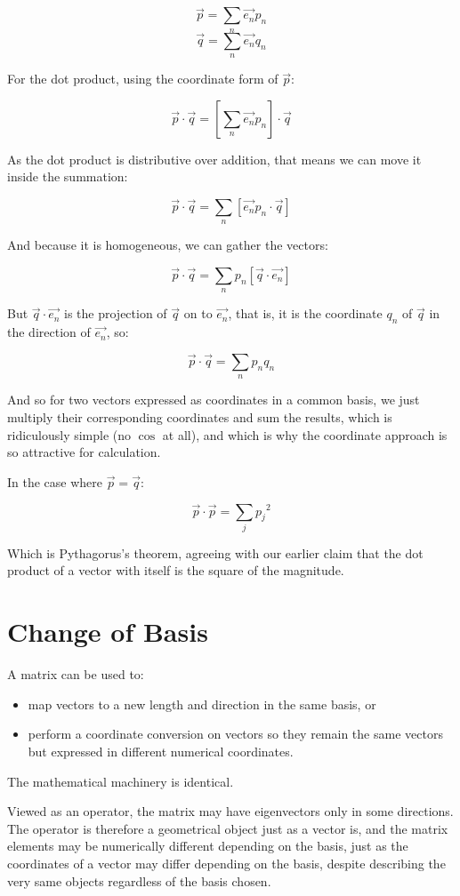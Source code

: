 $$\vec{p} = \sum_n \vec{e_n}p_n$$
$$\vec{q} = \sum_n \vec{e_n}q_n$$

For the dot product, using the coordinate form of $\vec{p}$:

$$
\vec{p}\cdot\vec{q} =
\left[ \sum_n{\vec{e_n}p_n} \right] \cdot \vec{q}
$$

As the dot product is distributive over addition, that means we can move it inside the summation:

$$
\vec{p}\cdot\vec{q} =
\sum_n \left[ \vec{e_n} p_n \cdot \vec{q} \right]
$$

And because it is homogeneous, we can gather the vectors:

$$
\vec{p}\cdot\vec{q} =
\sum_n p_n \left[ \vec{q} \cdot \vec{e_n} \right]
$$

But $\vec{q} \cdot \vec{e_n}$ is the projection of $\vec{q}$ on to $\vec{e_n}$, that is, it is the coordinate $q_n$ of $\vec{q}$ in the direction of $\vec{e_n}$, so:

$$
\vec{p}\cdot\vec{q} = \sum_n p_nq_n
$$

And so for two vectors expressed as coordinates in a common basis, we just multiply their corresponding coordinates and sum the results, which is ridiculously simple (no $\cos$ at all), and which is why the coordinate approach is so attractive for calculation.

In the case where $\vec{p} = \vec{q}$:

$$
\vec{p}\cdot\vec{p} = \sum_j {p_j}^2
$$

Which is Pythagorus's theorem, agreeing with our earlier claim that the dot product of a vector with itself is the square of the magnitude.

\section{Change of Basis}

A matrix can be used to:

\begin{itemize}
    \item map vectors to a new length and direction in the same basis, or
    \item perform a coordinate conversion on vectors so they remain the same vectors but expressed in different numerical coordinates.
\end{itemize}

The mathematical machinery is identical.

Viewed as an operator, the matrix may have eigenvectors only in some directions. The operator is therefore a geometrical object just as a vector is, and the matrix elements may be numerically different depending on the basis, just as the coordinates of a vector may differ depending on the basis, despite describing the very same objects regardless of the basis chosen.

